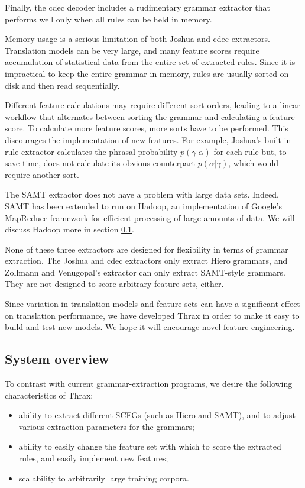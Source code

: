 \documentclass[11pt]{article}
\begin{document}
Finally, the cdec decoder \cite {cdec} includes a rudimentary grammar extractor that performs well only when all rules can be held in memory.

Memory usage is a serious limitation of both Joshua and cdec extractors. Translation models can be very large, and many feature scores require accumulation of statistical data from the entire set of extracted rules. Since it is impractical to keep the entire grammar in memory, rules are usually sorted on disk and then read sequentially.

Different feature calculations may require different sort orders, leading to a linear workflow that alternates between sorting the grammar and calculating a feature score. To calculate more feature scores, more sorts have to be performed. This discourages the implementation of new features. For example, Joshua's built-in rule extractor calculates the phrasal probability $p(\gamma|\alpha)$ for each rule but, to save time, does not calculate its obvious counterpart $p(\alpha|\gamma)$, which would require another sort.

The SAMT extractor does not have a problem with large data sets. Indeed, SAMT has been extended \cite{venugopal2009hadoop} to run on Hadoop, an implementation of Google's MapReduce framework for efficient processing of large amounts of data. We will discuss Hadoop more in section \ref{design}.

None of these three extractors are designed for flexibility in terms of grammar extraction. The Joshua and cdec extractors only extract Hiero grammars, and Zollmann and Venugopal's extractor can only extract SAMT-style grammars. They are not designed to score arbitrary feature sets, either.

Since variation in translation models and feature sets can have a significant effect on translation performance, we have developed Thrax in order to make it easy to build and test new models. We hope it will encourage novel feature engineering.

\subsection{System overview}
\label{design}

To contrast with current grammar-extraction programs, we desire the following characteristics of Thrax:
\begin{itemize}
\item ability to extract different SCFGs (such as Hiero and SAMT), and to adjust various extraction parameters for the grammars;
\item ability to easily change the feature set with which to score the extracted rules, and easily implement new features;
\item scalability to arbitrarily large training corpora.
\end{itemize}
\end{document}
